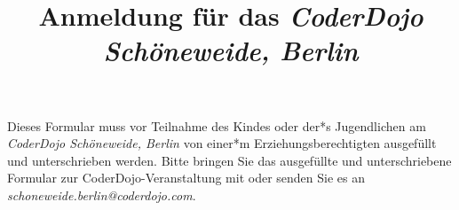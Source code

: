 \documentclass{coderdojoschoeneweide}
\title{Anmeldung für das \textit{CoderDojo Schöneweide, Berlin}}
\date{}
\begin{document}
\maketitle
\part*{}

\begin{Form}
Dieses Formular muss vor Teilnahme des Kindes oder der*s Jugendlichen am \textit{CoderDojo Schöneweide, Berlin} von einer*m Erziehungsberechtigten ausgefüllt und unterschrieben werden. Bitte bringen Sie das ausgefüllte und unterschriebene Formular zur CoderDojo-Veranstaltung mit oder senden Sie es an \textit{schoneweide.berlin@coderdojo.com}.








\end{Form}
\end{document}
